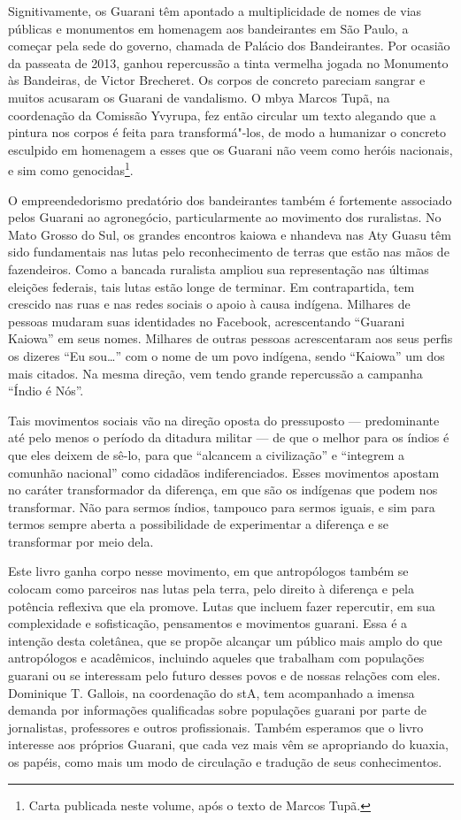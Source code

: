 Signitivamente, os Guarani têm apontado a multiplicidade de nomes de
vias públicas e monumentos em homenagem aos bandeirantes em São Paulo,
a começar pela sede do governo, chamada de Palácio dos Bandeirantes.
Por ocasião da passeata de 2013, ganhou repercussão a tinta vermelha
jogada no Monumento às Bandeiras, de Victor Brecheret. Os corpos de
concreto pareciam sangrar e muitos acusaram os Guarani de vandalismo. O
mbya Marcos Tupã, na coordenação da Comissão Yvyrupa, fez então
circular um texto alegando que a pintura nos corpos é feita para
transformá"-los, de modo a humanizar o concreto esculpido em homenagem a
esses que os Guarani não veem como heróis nacionais, e sim como
genocidas\footnote{Carta publicada neste volume, após o texto de
Marcos Tupã.}.

O empreendedorismo predatório dos bandeirantes também é fortemente
associado pelos Guarani ao agronegócio, particularmente ao movimento
dos ruralistas. No Mato Grosso do Sul, os grandes encontros kaiowa e
nhandeva nas Aty Guasu têm sido fundamentais nas lutas pelo
reconhecimento de terras que estão nas mãos de fazendeiros. Como a
bancada ruralista ampliou sua representação nas últimas eleições
federais, tais lutas estão longe de terminar. Em contrapartida, tem
crescido nas ruas e nas redes sociais o apoio à causa indígena.
Milhares de pessoas mudaram suas identidades no Facebook, acrescentando
``Guarani Kaiowa'' em seus nomes. Milhares de outras pessoas
acrescentaram aos seus perfis os dizeres ``Eu sou\ldots{}'' com o nome de um
povo indígena, sendo ``Kaiowa'' um dos mais citados. Na mesma direção,
vem tendo grande repercussão a campanha ``Índio é Nós''.

Tais movimentos sociais vão na direção oposta do pressuposto —
predominante até pelo menos o período da ditadura militar — de que o
melhor para os índios é que eles deixem de sê-lo, para que ``alcancem a
civilização'' e ``integrem a comunhão nacional'' como cidadãos
indiferenciados. Esses movimentos apostam no caráter transformador da
diferença, em que são os indígenas que podem nos transformar. Não para
sermos índios, tampouco para sermos iguais, e sim para termos sempre
aberta a possibilidade de experimentar a diferença e se transformar por
meio dela.

Este livro ganha corpo nesse movimento, em que antropólogos também se
colocam como parceiros nas lutas pela terra, pelo direito à diferença e
pela potência reflexiva que ela promove. Lutas que incluem fazer
repercutir, em sua complexidade e sofisticação, pensamentos e
movimentos guarani. Essa é a intenção desta coletânea, que se propõe
alcançar um público mais amplo do que antropólogos e acadêmicos,
incluindo aqueles que trabalham com populações guarani ou se interessam
pelo futuro desses povos e de nossas relações com eles. Dominique T.
Gallois, na coordenação do stA, tem acompanhado a imensa demanda por
informações qualificadas sobre populações guarani por
parte de jornalistas, professores e outros profissionais. Também esperamos que
o livro interesse aos próprios Guarani, que cada vez mais vêm se
apropriando do kuaxia, os papéis, como mais um modo de circulação e
tradução de seus conhecimentos.

